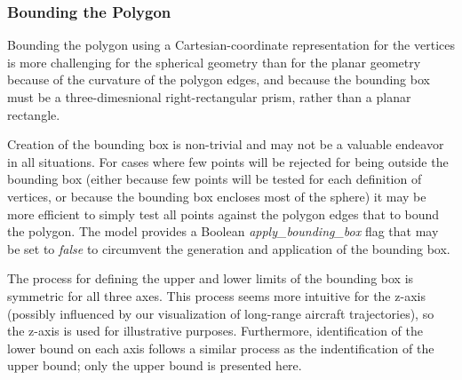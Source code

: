 \documentclass[11pt,fleqn]{report}
\begin{document}
\subsubsection{Bounding the Polygon}

Bounding the polygon using a Cartesian-coordinate representation for
the vertices is more challenging for the spherical geometry than for the
planar geometry because of the curvature of the polygon edges, and because
the bounding box must be a three-dimesnional right-rectangular prism, rather
than a planar rectangle.

Creation of the bounding box is non-trivial and may not be a valuable
endeavor in all situations. For cases where few points will be rejected for
being outside the bounding box (either because few points will be tested
for each definition of vertices, or because the bounding box encloses most of
the sphere) it may be more efficient to simply test
all points against the polygon edges that to bound the polygon. The model
provides a Boolean \textit{apply\_bounding\_box} flag that may be set to
\textit{false} to circumvent the generation and application of the bounding box.

The process for defining the upper and lower limits of the bounding box is
symmetric for all three axes. This process seems more intuitive for the
z-axis (possibly influenced by our visualization of long-range aircraft
trajectories), so the z-axis is used for illustrative purposes. Furthermore,
identification of the lower bound on each axis follows a similar process as
the indentification of the upper bound; only the upper bound is presented
here.
\end{document}
